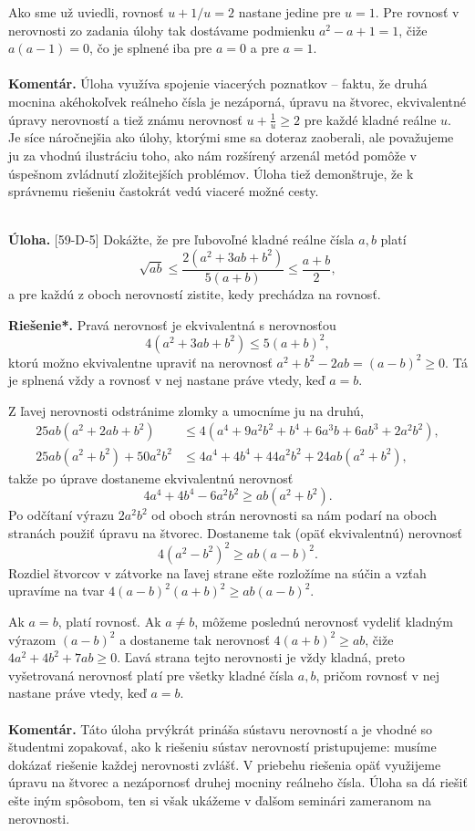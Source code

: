 \documentclass[11pt,a4paper,oneside,final]{book}
\newcommand{\kom}{\textbf{Komentár.} }
\newcommand{\ul}{\textbf{Úloha.} }
\newcommand{\rieh}{\textbf{Riešenie*.} }
\begin{document}
Ako sme už uviedli, rovnosť $u + 1/u = 2$ nastane jedine pre $u = 1$. Pre rovnosť v nerovnosti zo zadania úlohy tak dostávame podmienku $a^2 -a+1 = 1$, čiže $a(a-1)= 0$, čo je splnené iba pre $a = 0$ a pre $a = 1$.\\
\\
\kom Úloha využíva spojenie viacerých poznatkov -- faktu, že druhá mocnina akéhokoľvek reálneho čísla je nezáporná, úpravu na štvorec, ekvivalentné úpravy nerovností a tiež známu nerovnosť $u+\frac{1}{u} \geq 2$ pre každé kladné reálne $u$. Je síce náročnejšia ako úlohy, ktorými sme sa doteraz zaoberali, ale považujeme ju za vhodnú ilustráciu toho, ako nám rozšírený arzenál metód pomôže v úspešnom zvládnutí zložitejších problémov. Úloha tiež demonštruje, že k správnemu riešeniu častokrát vedú viaceré možné cesty.\\
\\
\begin{tcolorbox}[breakable,notitle,boxrule=0pt,colback=light-gray,colframe=light-gray]\ul [59-D-5] Dokážte, že pre ľubovoľné kladné reálne čísla $a, b$ platí
$$ \sqrt{ab}\leq \frac{2(a^2+3ab+b^2)}{5(a+b)}\leq \frac{a+b}{2},$$
a pre každú z oboch nerovností zistite, kedy prechádza na rovnosť.

\end{tcolorbox}

\rieh Pravá nerovnosť je ekvivalentná s nerovnosťou
$$ 4(a^2 + 3ab + b^2 ) \leq 5(a + b)^2,$$
ktorú možno ekvivalentne upraviť na nerovnosť $a^2 + b^2 - 2ab = (a - b)^2 \geq 0$. Tá je splnená vždy a rovnosť v nej nastane práve vtedy, keď $a = b$.

Z ľavej nerovnosti odstránime zlomky a umocníme ju na druhú,
\begin{align*}
25ab(a^2 + 2ab + b^2) &\leq 4(a^4 + 9a^2 b^2 + b^4 + 6a^3 b + 6ab^3 + 2a^2 b^2),\\
25ab(a^2 + b^2 ) + 50a^2 b^2 &\leq 4a^4 + 4b^4 + 44a^2 b^2 + 24ab(a^2 + b^2 ),
\end{align*}
takže po úprave dostaneme ekvivalentnú nerovnosť
$$4a^4 + 4b^4 - 6a^2 b^2 \geq ab(a^2 + b^2 ).$$
Po odčítaní výrazu $2a^2 b^2$ od oboch strán nerovnosti sa nám podarí na oboch stranách použiť úpravu na štvorec. Dostaneme tak (opäť ekvivalentnú) nerovnosť $$ 4(a^2 - b^2 )^2 \geq ab(a - b)^2.$$
Rozdiel štvorcov v zátvorke na ľavej strane ešte rozložíme na súčin a vzťah upravíme
na tvar $4(a - b)^2 (a + b)^2 \geq ab(a - b)^2$.

Ak $a = b$, platí rovnosť. Ak $a \neq b$, môžeme poslednú nerovnosť vydeliť kladným výrazom $(a - b)^2$ a dostaneme tak nerovnosť $4(a + b)^2 \geq ab$, čiže $4a^2 + 4b^2 + 7ab \geq 0$. Ľavá strana tejto nerovnosti je vždy kladná, preto vyšetrovaná nerovnosť platí pre všetky kladné čísla $a, b$, pričom rovnosť v nej nastane práve vtedy, keď $a = b$.\\
\\
\kom Táto úloha prvýkrát prináša sústavu nerovností a je vhodné so študentmi zopakovať, ako k riešeniu sústav nerovností pristupujeme: musíme dokázať riešenie každej nerovnosti zvlášť. V priebehu riešenia opäť využijeme úpravu na štvorec a nezápornosť druhej mocniny reálneho čísla. Úloha sa dá riešiť ešte iným spôsobom, ten si však ukážeme v ďalšom seminári zameranom na nerovnosti.
\end{document}
